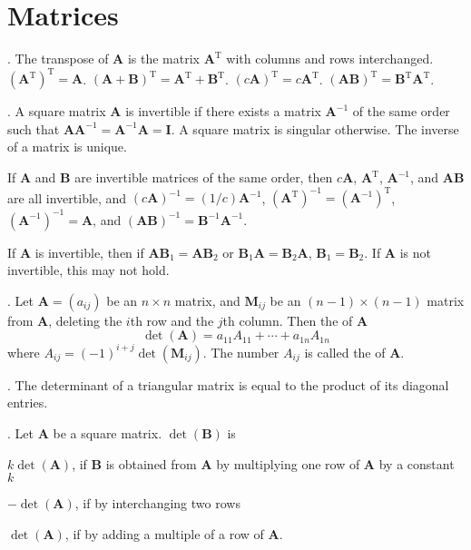 \documentclass{slnotes}
\newcommand*{\TT}{\mathrm{T}}
\begin{document}
\chapter{Matrices}
. The transpose of \(\mathbf{A}\) is the matrix \(\mathbf{A}^{\TT}\) with columns and rows interchanged. \((\mathbf{A}^{\TT})^{\TT} = \mathbf{A}\). \((\mathbf{A} + \mathbf{B})^{\TT} = \mathbf{A}^{\TT} + \mathbf{B}^{\TT}\). \((c\mathbf{A})^{\TT} = c\mathbf{A}^{\TT}\). \((\mathbf{AB})^{\TT} = \mathbf{B}^{\TT}\mathbf{A}^{\TT}\).

. A square matrix \(\mathbf{A}\) is invertible if there exists a matrix \(\mathbf{A}^{-1}\) of the same order such that \(\mathbf{AA}^{-1} = \mathbf{A}^{-1}\mathbf{A} = \mathbf I\). A square matrix is singular otherwise. The inverse of a matrix is unique.

If \(\mathbf{A}\) and \(\mathbf{B}\) are invertible matrices of the same order, then \(c\mathbf{A}\), \(\mathbf{A}^{\TT}\), \(\mathbf{A}^{-1}\), and \(\mathbf{AB}\) are all invertible, and \((c\mathbf{A})^{-1} = (1/c)\mathbf{A}^{-1}\), \((\mathbf{A}^{\TT})^{-1} = (\mathbf{A}^{-1})^{\TT}\), \((\mathbf{A}^{-1})^{-1} = \mathbf{A}\), and \((\mathbf{AB})^{-1} = \mathbf{B}^{-1}\mathbf{A}^{-1}\).

If \(\mathbf{A}\) is invertible, then if \(\mathbf{AB}_1 = \mathbf{AB}_2\) or \(\mathbf{B}_1\mathbf{A} = \mathbf{B}_2\mathbf{A}\), \(\mathbf{B}_1 = \mathbf{B}_2\). If \(\mathbf{A}\) is not invertible, this may not hold.

. Let \(\mathbf{A} = (a_{ij})\) be an \(n \times n\) matrix, and \(\mathbf{M}_{ij}\) be an \((n - 1)\times(n - 1)\) matrix from \(\mathbf{A}\), deleting the \(i\)th row and the \(j\)th column. Then the  of \(\mathbf{A}\)\[\det(\mathbf A) = a_{11}A_{11} + \cdots + a_{1n}A_{1n}\]where \(A_{ij} = (-1)^{i+j}\det(\mathbf{M}_{ij})\). The number \(A_{ij}\) is called the  of \(\mathbf{A}\).

. The determinant of a triangular matrix is equal to the product of its diagonal entries.

. Let \(\mathbf{A}\) be a square matrix. \(\det(\mathbf B)\) is
\begin{slinenum}
\item \(k\det(\mathbf A)\), if \(\mathbf{B}\) is obtained from \(\mathbf{A}\) by multiplying one row of \(\mathbf{A}\) by a constant \(k\)
\item \(-\det(\mathbf A)\), if by interchanging two rows
\item \(\det(\mathbf A)\), if by adding a multiple of a row of \(\mathbf{A}\).
\end{slinenum}
\end{document}
